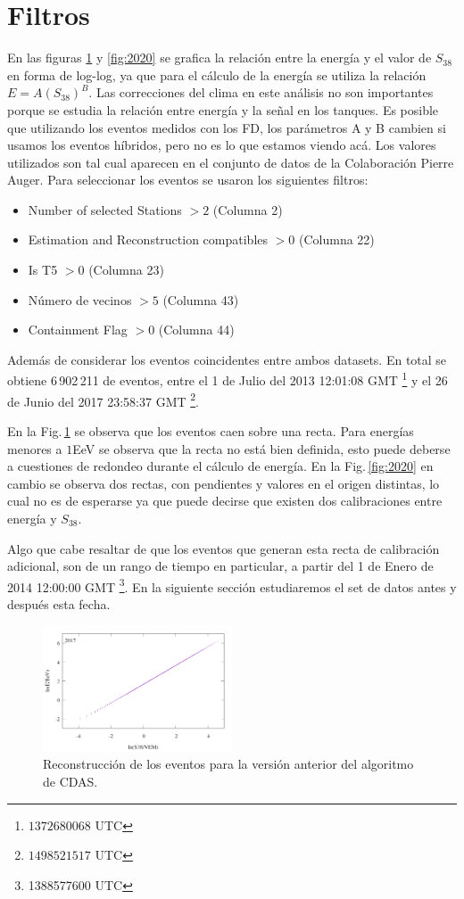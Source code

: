 \section{Filtros}
En las figuras \ref{fig:2017} y \ref{fig:2020} se grafica la relación entre la energía y el valor de $S_{38}$ en forma de log-log, ya que para el cálculo de la energía se utiliza la relación $E=A(S_{38})^B$. Las correcciones del clima en este análisis no son importantes porque 
se estudia la relación entre energía y la señal en los tanques. Es posible que utilizando los eventos medidos con los FD, los  parámetros A y B cambien si usamos los eventos híbridos, pero no es lo que estamos viendo acá. Los valores utilizados son tal cual aparecen en el conjunto de datos de la Colaboración Pierre Auger. Para seleccionar los eventos se usaron los siguientes filtros:

\begin{itemize}
	\item Number of selected Stations $>2$ (Columna 2) 
	\item Estimation and Reconstruction compatibles $>0$  (Columna 22)  
	\item Is T5 $>0$  (Columna 23)  
	\item Número de vecinos $>5$  (Columna 43) 
	\item Containment Flag $>0$  (Columna 44)  
\end{itemize}

Además de considerar los eventos coincidentes entre ambos datasets. En total se obtiene 6\,902\,211 de eventos, entre el 1 de Julio del 2013 12:01:08 GMT \footnote{$1372680068$ UTC} y el 26 de Junio del 2017 23:58:37 GMT \footnote{$1498521517$ UTC}.


En la Fig.\,\ref{fig:2017} se observa que los eventos caen sobre una recta. Para energías menores a $1 $EeV se observa que la recta no está bien definida, esto puede deberse a cuestiones de redondeo durante el cálculo de energía. En la Fig.\,\ref{fig:2020} en cambio se observa  dos rectas, con pendientes y valores en el origen distintas, lo cual no es de esperarse ya que puede decirse que existen dos calibraciones entre energía y $S_{38}$. 

Algo que cabe resaltar de que los eventos que generan esta recta de calibración adicional, son de un rango de tiempo en particular, a partir del 1 de Enero de 2014 12:00:00 GMT \footnote{ 1388577600 UTC}. En la siguiente sección estudiaremos el set de datos antes y después esta fecha.


\begin{figure}[H]
	\centering
	\includegraphics[width=0.5\textwidth]{curva_calibracion_all_2017.png}
	\caption{Reconstrucción de los eventos para la versión anterior del algoritmo de CDAS.}
	\label{fig:2017}
\end{figure}


